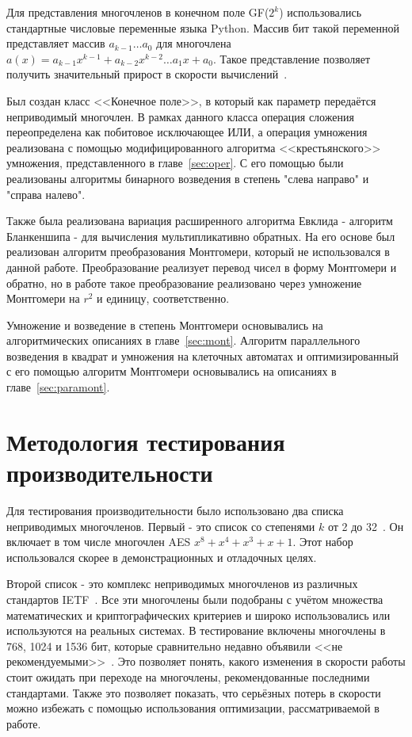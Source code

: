 \documentclass[times,specification,annotation]{itmo-student-thesis}
\begin{document}
Для представления многочленов в конечном поле GF($2^k$) использовались стандартные числовые переменные языка Python.
Массив бит такой переменной представляет массив $a_{k-1} \dots a_0$ для многочлена
$a(x) = a_{k-1} x^{k-1} + a_{k-2} x^{k-2} \dots a_1 x + a_0$.
Такое представление позволяет получить значительный прирост в скорости вычислений~\cite{mau15}.

Был создан класс <<Конечное поле>>, в который как параметр передаётся неприводимый многочлен.
В рамках данного класса операция сложения переопределена как побитовое исключающее ИЛИ, а операция умножения
реализована с помощью модифицированного алгоритма <<крестьянского>> умножения, представленного в главе~\ref{sec:oper}.
С его помощью были реализованы алгоритмы бинарного возведения в степень "слева направо" и "справа налево".

Также была реализована вариация расширенного алгоритма Евклида - алгоритм Бланкеншипа - для вычисления мультипликативно обратных.
На его основе был реализован алгоритм преобразования Монтгомери, который не использовался в данной работе.
Преобразование реализует перевод чисел в форму Монтгомери и обратно, но в работе такое преобразование реализовано через
умножение Монтгомери на $r^2$ и единицу, соответственно.

Умножение и возведение в степень Монтгомери основывались на алгоритмических описаниях в главе~\ref{sec:mont}.
Алгоритм параллельного возведения в квадрат и умножения на клеточных автоматах и оптимизированный с его помощью алгоритм Монтгомери
основывались на описаниях в главе~\ref{sec:paramont}.

\section{Методология тестирования производительности}\label{sec:meth}

Для тестирования производительности было использовано два списка неприводимых многочленов.
Первый - это список со степенями $k$ от 2 до 32~\cite{par17}.
Он включает в том числе многочлен AES $x^8+x^4+x^3+x+1$.
Этот набор использовался скорее в демонстрационных и отладочных целях.

Второй список - это комплекс неприводимых многочленов из различных стандартов IETF~\cite{rfc2412, rfc3526, rfc7296, rfc7919}.
Все эти многочлены были подобраны с учётом множества математических и криптографических критериев и широко использовались
или используются на реальных системах.
В тестирование включены многочлены в 768, 1024 и 1536 бит, которые сравнительно недавно объявили <<не рекомендуемыми>>~\cite{rfc8247}.
Это позволяет понять, какого изменения в скорости работы стоит ожидать при переходе на многочлены, рекомендованные последними стандартами.
Также это позволяет показать, что серьёзных потерь в скорости можно избежать с помощью использования оптимизации, рассматриваемой в работе.
\end{document}
